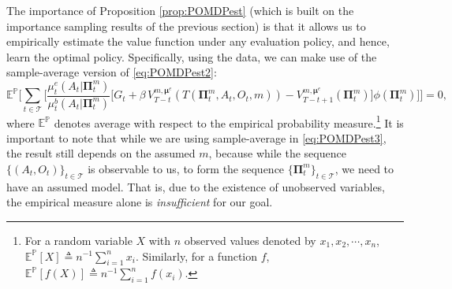 \documentclass[opre,nonblindrev]{informs2}%
\newcommand{\teq}{\triangleq}
\newcommand{\1}{\hbox{\rm 1\kern-.35em 1}}
\newcommand{\E}{\mathbb E}
\newcommand{\MT}{\mathscr T}
\newcommand{\bPi}{\boldsymbol{\Pi}}
\newcommand{\bmu}{\boldsymbol{\mu}}
\begin{document}
The importance of Proposition \ref{prop:POMDPest} (which is built on the importance sampling results of the previous section)  is that it allows us to empirically estimate the value function under any evaluation policy, and hence, learn the optimal policy. Specifically, using the data, we can make use of the sample-average version of \eqref{eq:POMDPest2}:
\begin{equation} \label{eq:POMDPest3}
\E^{\mathbb P} \Bigg[ \sum_{t\in\MT}\bigg[ \frac{\mu_t^e(A_t|\bPi^m_t)}{\mu_t^b(A_t|\bPi^m_t)}\Big[G_t+ \beta\, V_{T-t}^{m,\bmu^e}  (T(\bPi^m_t, A_t, O_t, m))- V_{T-t+1}^{m,\bmu^e}  (\bPi^m_t)\Big] \phi (\bPi^m_t)\bigg]\Bigg]=0,
\end{equation}
where $\E^{\mathbb P}$ denotes average with respect to the empirical probability measure.\footnote{For a random variable $X$ with $n$ observed values denoted by $x_1, x_2,\cdots, x_n$, $\E^{\mathbb P}[X]\teq n^{-1} \sum_{i=1}^n x_i$. Similarly, for a function $f$, $\E^{\mathbb P}[f(X)]\teq n^{-1} \sum_{i=1}^n f(x_i)$.}  It is important to note that while we are using sample-average in \eqref{eq:POMDPest3}, the result still depends on the assumed $m$, because while the sequence $\{(A_t, O_t)\}_{t\in\MT}$ is observable to us, to form the sequence $\{\bPi^m_t\}_{t\in\MT}$, we need to have an assumed model. That is, due to the existence of unobserved variables, the empirical measure alone is {\em insufficient} for our goal.
\end{document}

